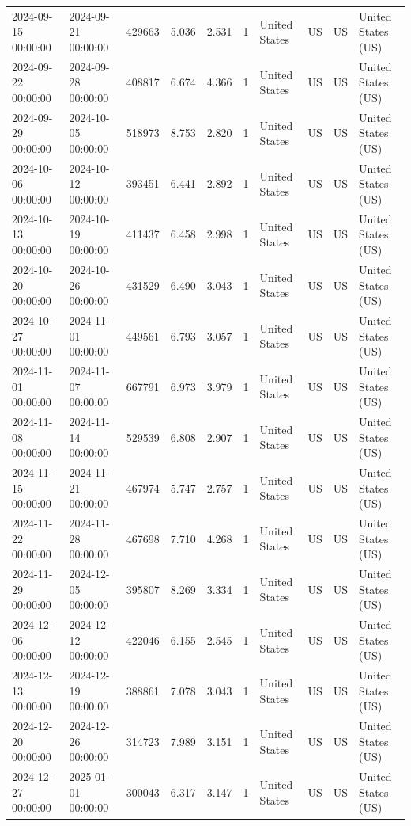 \begin{tabular}{llrrrlllll}
2024-09-15 00:00:00 & 2024-09-21 00:00:00 & 429663 & 5.036 & 2.531 & 1 & United States & US & US & United States (US) \\
2024-09-22 00:00:00 & 2024-09-28 00:00:00 & 408817 & 6.674 & 4.366 & 1 & United States & US & US & United States (US) \\
2024-09-29 00:00:00 & 2024-10-05 00:00:00 & 518973 & 8.753 & 2.820 & 1 & United States & US & US & United States (US) \\
2024-10-06 00:00:00 & 2024-10-12 00:00:00 & 393451 & 6.441 & 2.892 & 1 & United States & US & US & United States (US) \\
2024-10-13 00:00:00 & 2024-10-19 00:00:00 & 411437 & 6.458 & 2.998 & 1 & United States & US & US & United States (US) \\
2024-10-20 00:00:00 & 2024-10-26 00:00:00 & 431529 & 6.490 & 3.043 & 1 & United States & US & US & United States (US) \\
2024-10-27 00:00:00 & 2024-11-01 00:00:00 & 449561 & 6.793 & 3.057 & 1 & United States & US & US & United States (US) \\
2024-11-01 00:00:00 & 2024-11-07 00:00:00 & 667791 & 6.973 & 3.979 & 1 & United States & US & US & United States (US) \\
2024-11-08 00:00:00 & 2024-11-14 00:00:00 & 529539 & 6.808 & 2.907 & 1 & United States & US & US & United States (US) \\
2024-11-15 00:00:00 & 2024-11-21 00:00:00 & 467974 & 5.747 & 2.757 & 1 & United States & US & US & United States (US) \\
2024-11-22 00:00:00 & 2024-11-28 00:00:00 & 467698 & 7.710 & 4.268 & 1 & United States & US & US & United States (US) \\
2024-11-29 00:00:00 & 2024-12-05 00:00:00 & 395807 & 8.269 & 3.334 & 1 & United States & US & US & United States (US) \\
2024-12-06 00:00:00 & 2024-12-12 00:00:00 & 422046 & 6.155 & 2.545 & 1 & United States & US & US & United States (US) \\
2024-12-13 00:00:00 & 2024-12-19 00:00:00 & 388861 & 7.078 & 3.043 & 1 & United States & US & US & United States (US) \\
2024-12-20 00:00:00 & 2024-12-26 00:00:00 & 314723 & 7.989 & 3.151 & 1 & United States & US & US & United States (US) \\
2024-12-27 00:00:00 & 2025-01-01 00:00:00 & 300043 & 6.317 & 3.147 & 1 & United States & US & US & United States (US) \\
\bottomrule
\end{tabular}
